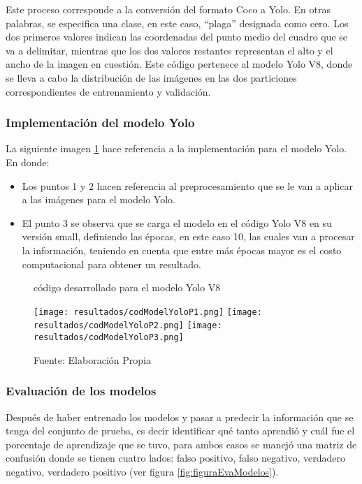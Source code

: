 \newpage

Este proceso corresponde a la conversión del formato Coco a Yolo. En otras palabras, se especifica una clase, en este caso, ``plaga'' designada como cero. Los dos primeros valores indican las coordenadas del punto medio del cuadro que se va a delimitar, mientras que los dos valores restantes representan el alto y el ancho de la imagen en cuestión. Este código pertenece al modelo Yolo V8, donde se lleva a cabo la distribución de las imágenes en las dos particiones correspondientes de entrenamiento y validación.


\subsubsection{Implementación del modelo Yolo}

La siguiente imagen \ref{fig:figuraCodModelYolo} hace referencia a la implementación para el modelo Yolo. En donde:

\begin{itemize}
    \item Los puntos 1 y 2 hacen referencia al preprocesamiento que se le van a aplicar a las imágenes para el modelo Yolo.
    \item El punto 3 se observa que se carga el modelo en el código Yolo V8 en su versión small, definiendo las épocas, en este caso 10, las cuales van a procesar la información, teniendo en cuenta que entre más épocas mayor es el costo computacional para obtener un resultado. 
\end{itemize}

\newpage

\begin{figure}[h]
\centering
\caption{código desarrollado para el modelo Yolo V8}
\texttt{[image: resultados/codModelYoloP1.png]}
\texttt{[image: resultados/codModelYoloP2.png]}
\texttt{[image: resultados/codModelYoloP3.png]}
\caption*{\footnotesize Fuente: Elaboración Propia}
\label{fig:figuraCodModelYolo}
\end{figure}

\subsubsection{Evaluación de los modelos}

Después de haber entrenado los modelos y pasar a predecir la información que se tenga del  conjunto de prueba, es decir identificar qué tanto aprendió y cuál fue el porcentaje de aprendizaje que se tuvo, para ambos casos se manejó una matriz de confusión donde se tienen cuatro lados: falso positivo, falso negativo, verdadero negativo, verdadero positivo (ver figura \ref{fig:figuraEvaModelos}).

